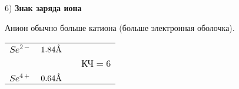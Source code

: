 \par\smallskip

6) \textbf{Знак заряда иона}

\par\smallskip

Анион обычно больше катиона (больше электронная оболочка).

\par\smallskip

\begin{center}
	\begin{tabular}[c]{llll}
		$Se^{2-}$ & $1.84 \textup{\AA}$ &  &   \\
		&   &  & КЧ$=6$ \\
		$Se^{4+}$ & $0.64 \textup{\AA}$&  &  
	\end{tabular}
\end{center}

\par\bigskip
\par\bigskip